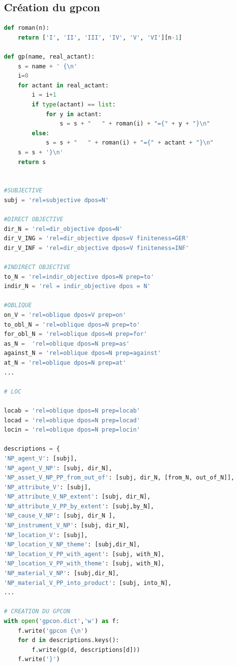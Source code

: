\subsection{Création du gpcon}

\begin{lstlisting}[language=Python, caption = code pour gpcon.dict]
def roman(n):
    return ['I', 'II', 'III', 'IV', 'V', 'VI'][n-1]
		
def gp(name, real_actant):
    s = name + ' {\n'
    i=0
    for actant in real_actant:
        i = i+1
        if type(actant) == list:
            for y in actant:
                s = s + "   " + roman(i) + "={" + y + "}\n"
        else:
            s = s + "   " + roman(i) + "={" + actant + "}\n"
    s = s + '}\n'
    return s


#SUBJECTIVE
subj = 'rel=subjective dpos=N'

#DIRECT OBJECTIVE
dir_N = 'rel=dir_objective dpos=N'
dir_V_ING = 'rel=dir_objective dpos=V finiteness=GER'
dir_V_INF = 'rel=dir_objective dpos=V finiteness=INF'

#INDIRECT OBJECTIVE
to_N = 'rel=indir_objective dpos=N prep=to'
indir_N = 'rel = indir_objective dpos = N'

#OBLIQUE
on_V = 'rel=oblique dpos=V prep=on'
to_obl_N = 'rel=oblique dpos=N prep=to' 
for_obl_N = 'rel=oblique dpos=N prep=for'
as_N =  'rel=oblique dpos=N prep=as'
against_N = 'rel=oblique dpos=N prep=against'
at_N = 'rel=oblique dpos=N prep=at'
...

# LOC

locab = 'rel=oblique dpos=N prep=locab'
locad = 'rel=oblique dpos=N prep=locad'
locin = 'rel=oblique dpos=N prep=locin'

descriptions = {
'NP_agent_V': [subj],
'NP_agent_V_NP': [subj, dir_N],
'NP_asset_V_NP_PP_from_out_of': [subj, dir_N, [from_N, out_of_N]],
'NP_attribute_V': [subj],
'NP_attribute_V_NP_extent': [subj, dir_N],
'NP_attribute_V_PP_by_extent': [subj,by_N],
'NP_cause_V_NP': [subj, dir_N ],
'NP_instrument_V_NP': [subj, dir_N],
'NP_location_V': [subj],
'NP_location_V_NP_theme': [subj,dir_N],
'NP_location_V_PP_with_agent': [subj, with_N],
'NP_location_V_PP_with_theme': [subj, with_N],
'NP_material_V_NP': [subj,dir_N],
'NP_material_V_PP_into_product': [subj, into_N],
...

# CREATION DU GPCON
with open('gpcon.dict','w') as f:
    f.write('gpcon {\n')
    for d in descriptions.keys():
        f.write(gp(d, descriptions[d]))
    f.write('}')

\end{lstlisting}

